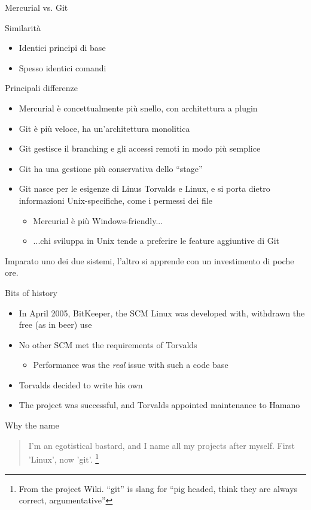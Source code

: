 \documentclass[presentation]{beamer}
\begin{document}
\begin{frame}{Mercurial vs. Git}
	\begin{block}{Similarità}
		\begin{itemize}
			\item Identici principi di base
			\item Spesso identici comandi
		\end{itemize}
	\end{block}
	\begin{block}{Principali differenze}
		\begin{itemize}
			\item Mercurial è concettualmente più snello, con architettura a plugin
			\item Git è più veloce, ha un'architettura monolitica
			\item Git gestisce il branching e gli accessi remoti in modo più semplice
			\item Git ha una gestione più conservativa dello ``stage''
			\item Git nasce per le esigenze di Linus Torvalds e Linux, e si porta dietro informazioni Unix-specifiche, come i permessi dei file
			\begin{itemize}
				\item Mercurial è più Windows-friendly...
				\item ...chi sviluppa in Unix tende a preferire le feature aggiuntive di Git
			\end{itemize}
		\end{itemize}
	\end{block}
	Imparato uno dei due sistemi, l'altro si apprende con un investimento di poche ore.
\end{frame}

\begin{frame}[fragile]{Bits of history}
	\begin{itemize}
		\item In April 2005, BitKeeper, the SCM Linux was developed with, withdrawn the free (as in beer) use
		\item No other SCM met the requirements of Torvalds
		\begin{itemize}
			\item Performance was the \textit{real} issue with such a code base
		\end{itemize}
		\item Torvalds decided to write his own
		\item The project was successful, and Torvalds appointed maintenance to Hamano
	\end{itemize}
	\begin{block}{Why the name}
		\begin{quote}
			I'm an egotistical bastard, and I name all my projects after myself. First 'Linux', now 'git'. \footnote{\tiny{From the project Wiki. ``git'' is slang for ``pig headed, think they are always correct, argumentative''}}
			\begin{flushright}
			\end{flushright}
		\end{quote}
	\end{block}
\end{frame}
\end{document}
